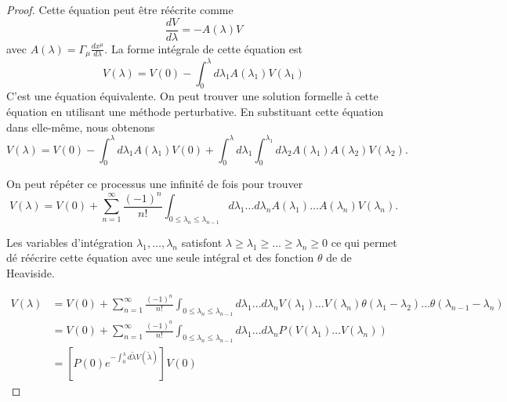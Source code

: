 \documentclass[a4paper,11pt]{report}
\begin{document}
                \begin{proof}
                    Cette équation peut être réécrite comme
                    \begin{equation}
                        \frac{dV}{d\lambda} = -A(\lambda)V
                    \end{equation}
                    avec $A(\lambda) = \Gamma_\mu \frac{dx^\mu}{d\lambda}$. La forme intégrale de cette équation est 
                    \begin{equation}
                        V(\lambda) = V(0) - \int_0^\lambda d\lambda_1 A(\lambda_1)V(\lambda_1)
                    \end{equation}
                    C'est une équation équivalente. On peut trouver une solution formelle à cette équation en utilisant une méthode perturbative. En substituant cette équation dans elle-même, nous obtenons
                    \begin{equation}
                        V(\lambda) = V(0) - \int_0^\lambda d\lambda_1 A(\lambda_1)V(0)+\int_0^\lambda d\lambda_1\int_0^{\lambda_1}d\lambda_2A(\lambda_1)A(\lambda_2)V(\lambda_2).
                    \end{equation}
                    
                    On peut répéter ce processus une infinité de fois pour trouver
                    \begin{equation}
                        V(\lambda) = V(0) + \sum_{n=1}^\infty\frac{(-1)^n}{n!}\int_{0\leq\lambda_n\leq\lambda_{n-1}}d\lambda_1\dots d\lambda_n A(\lambda_1)\dots A(\lambda_n)V(\lambda_n).
                    \end{equation}
        
                    Les variables d'intégration $\lambda_1,\dots,\lambda_n$ satisfont $\lambda\geq\lambda_1\geq\dots\geq\lambda_n\geq0$ ce qui permet dé réécrire cette équation avec une seule intégral et des fonction $\theta$ de de Heaviside.
                    
                    \begin{align}
                        V(\lambda) &= V(0) + \sum_{n=1}^\infty\frac{(-1)^n}{n!}\int_{0\leq\lambda_n\leq\lambda_{n-1}}d\lambda_1\dots d\lambda_n V(\lambda_1)\dots V(\lambda_n)\theta(\lambda_1-\lambda_2)\dots\theta(\lambda_{n-1}-\lambda_n) \\
                        &= V(0) + \sum_{n=1}^\infty\frac{(-1)^n}{n!}\int_{0\leq\lambda_n\leq\lambda_{n-1}}d\lambda_1\dots d\lambda_n P\left(V(\lambda_1)\dots V(\lambda_n)\right)\\
                        &= \left[P(0)e^{-\int_0^\lambda d\widetilde{\lambda}V(\widetilde{\lambda})}\right]V(0)
                    \end{align}
                \end{proof}
                
\end{document}
